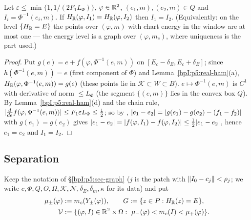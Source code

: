 \begin{lemma}[Energy equation is uniquely solvable in $e=h(I)$]\label{bpI:p5:energy-coordinate}
Let $\varepsilon\le\min\{1,1/(2F_1L_\Phi)\}$, $\varphi\in\mathbb{R}^2$, $(e_1,m),(e_2,m)\in Q$ and $I_i=\Phi^{-1}(e_i,m)$. If $H_{\mathbb{R}}(\varphi,I_1)=H_{\mathbb{R}}(\varphi,I_2)$ then $I_1=I_2$.
(Equivalently: on the level $\{H_{\mathbb{R}}=E\}$ the points over $(\varphi,m)$ with chart energy in the window are at most one --- the energy level is a graph over $(\varphi,m_c)$, where uniqueness is the part used.)
\end{lemma}
\begin{proof}
\label{stepI:p5:ec-reduce} Put $g(e)=e+f(\varphi,\Phi^{-1}(e,m))$ on $[E_c-\delta_E,E_c+\delta_E]$; since $h(\Phi^{-1}(e,m))=e$ (first component of $\Phi$) and Lemma~\ref{bpI:p5:real-ham}(a), $H_{\mathbb{R}}(\varphi,\Phi^{-1}(e,m))=g(e)$ (these points lie in $\mathcal K\subset W\subset B$).
\label{stepI:p5:ec-lip} $e\mapsto\Phi^{-1}(e,m)$ is $C^1$ with derivative of norm $\le L_\Phi$ (the segment $\{(e,m)\}$ lies in the convex box $Q$). By Lemma~\ref{bpI:p5:real-ham}(d) and the chain rule, $\lvert \frac{d}{de}f(\varphi,\Phi^{-1}(e,m))\rvert\le F_1\varepsilon L_\Phi\le\tfrac12$; so by , $\lvert e_1-e_2\rvert=\lvert g(e_1)-g(e_2)-(f_1-f_2)\rvert$ with $g(e_1)=g(e_2)$ gives $\lvert e_1-e_2\rvert=\lvert f(\varphi,I_1)-f(\varphi,I_2)\rvert\le\tfrac12\lvert e_1-e_2\rvert$, hence $e_1=e_2$ and $I_1=I_2$.
\end{proof}

\subsection{Separation}\label{bpI:p5:sec-sep}

Keep the notation of \S\ref{bpI:p5:sec-graph} ($j$ is the patch with $\lVert I_0-c_j\rVert<\rho_j$; we write $c,\Phi,Q,O,\Omega,\mathcal K,\mathcal N,\delta_E,\delta_m,\kappa$ for its data) and put
\begin{align*}
\mu_\pm(\varphi)&:=m_c(Y_\pm(\varphi)),\qquad G:=\{z\in P:H_\R(z)=E\},\\
\mathcal V&:=\{(\varphi,I)\in\R^2\times\Omega:\ \mu_-(\varphi)<m_c(I)<\mu_+(\varphi)\}.
\end{align*}

